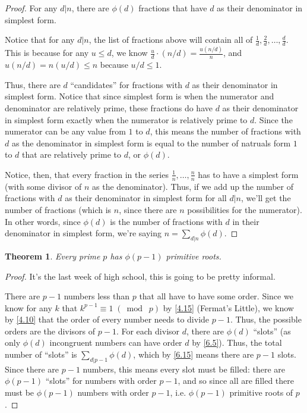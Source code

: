 \documentclass{article}
\newtheorem{thm}{Theorem}[section]
\numberwithin{equation}{thm}
\providecommand{\gmod}[1]{\; (\bmod \; #1)}
\begin{document}
\begin{proof}
  For any $d | n$, there are $\phi(d)$ fractions that have $d$ as their denominator in simplest form.

  Notice that for any $d | n$, the list of fractions above will contain all of $\frac{1}{d}, \frac{2}{d}, \ldots, \frac{d}{d}$. This is because for any $u \leq d$, we know $\frac{u}{d} \cdot (n/d) = \frac{u(n/d)}{n}$, and $u(n/d) = n(u/d) \leq n$ because $u/d \leq 1$.

  Thus, there are $d$ ``candidates'' for fractions with $d$ as their denominator in simplest form. Notice that since simplest form is when the numerator and denominator are relatively prime, these fractions do have $d$ as their denominator in simplest form exactly when the numerator is relatively prime to $d$. Since the numerator can be any value from $1$ to $d$, this means the number of fractions with $d$ as the denominator in simplest form is equal to the number of natruals form $1$ to $d$ that are relatively prime to $d$, or $\phi(d)$.

  Notice, then, that every fraction in the series $\frac{1}{n}, \ldots, \frac{n}{n}$ has to have a simplest form (with some divisor of $n$ as the denominator). Thus, if we add up the number of fractions with $d$ as their denominator in simplest form for all $d | n$, we'll get the number of fractions (which is $n$, since there are $n$ possibilities for the numerator). In other words, since $\phi(d)$ is the number of fractions with $d$ in their denominator in simplest form, we're saying $n = \sum_{d | n} \phi(d)$.
\end{proof}



\begin{thm} \label{6.17}
  Every prime $p$ has $\phi(p-1)$ primitive roots.
\end{thm}

\begin{proof}
  It's the last week of high school, this is going to be pretty informal.

  There are $p-1$ numbers less than $p$ that all have to have some order. Since we know for any $k$ that $k^{p-1} \equiv 1 \gmod p$ by \ref{4.15} (Fermat's Little), we know by \ref{4.10} that the order of every number needs to divide $p-1$. Thus, the possible orders are the divisors of $p-1$. For each divisor $d$, there are $\phi(d)$ ``slots'' (as only $\phi(d)$ incongruent numbers can have order $d$ by \ref{6.5}).
  Thus, the total number of ``slots'' is $\sum_{d|p-1} \phi(d)$, which by \ref{6.15} means there are $p-1$ slots. Since there are $p-1$ numbers, this means every slot must be filled: there are $\phi(p-1)$ ``slots'' for numbers with order $p-1$, and so since all are filled there must be $\phi(p-1)$ numbers with order $p-1$, i.e. $\phi(p-1)$ primitive roots of $p$.
\end{proof}
\end{document}
